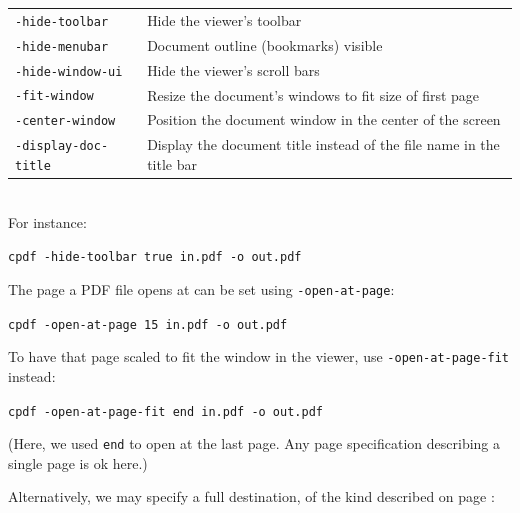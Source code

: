 \documentclass{book}
\begin{document}
\vspace{2mm}
  {\small\begin{tabular}{ll}
    \texttt{-hide-toolbar} & \vspace{2mm} \parbox{8cm}{Hide the viewer's toolbar} \\
    \texttt{-hide-menubar} & \vspace{2mm} \parbox{8cm}{Document outline (bookmarks) visible} \\
    \texttt{-hide-window-ui} & \vspace{2mm} \parbox{8cm}{Hide the viewer's scroll bars} \\
    \texttt{-fit-window} & \vspace{2mm} \parbox{8cm}{Resize the document's windows to fit size of first page} \\
    \texttt{-center-window} & \vspace{2mm} \parbox{8cm}{Position the document window in the center of the screen} \\
    \texttt{-display-doc-title} & \vspace{2mm} \parbox{8cm}{Display the document title instead of the file name in the title bar}
  \end{tabular}}\\

  \noindent For instance:

  \begin{framed}
    \noindent\small\verb!cpdf -hide-toolbar true in.pdf -o out.pdf!
  \end{framed}

\noindent The page a PDF file opens at can be set using \texttt{-open-at-page}:

  \begin{framed}
    \noindent\small\verb!cpdf -open-at-page 15 in.pdf -o out.pdf!
  \end{framed}

\noindent To have that page scaled to fit the window in the viewer, use \texttt{-open-at-page-fit} instead:

  \begin{framed}
    \noindent\small\verb!cpdf -open-at-page-fit end in.pdf -o out.pdf!
  \end{framed}

\noindent (Here, we used \texttt{end} to open at the last page. Any page specification describing a single page is ok here.)

Alternatively, we may specify a full destination, of the kind described on page \pageref{destinations}:
\end{document}

